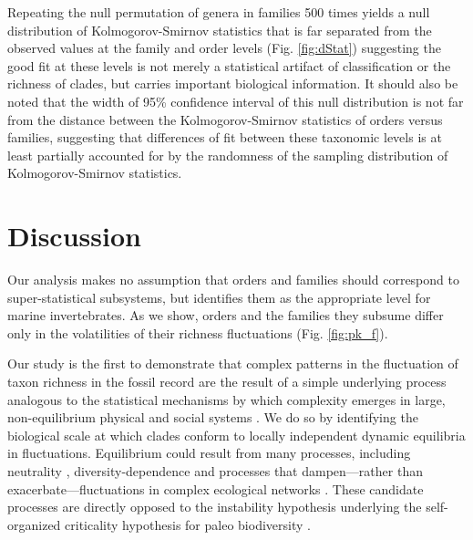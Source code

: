 \documentclass[12pt]{article}
\let\citep=\cite
\begin{document}
Repeating the null permutation of genera in families 500 times yields
a null distribution of Kolmogorov-Smirnov statistics that is far
separated from the observed values at the family and order levels
(Fig. \ref{fig:dStat}) suggesting the good fit at these levels is not
merely a statistical artifact of classification or the richness of
clades, but carries important biological information. It should also
be noted that the width of 95\% confidence interval of this null
distribution is not far from the distance between the
Kolmogorov-Smirnov statistics of orders versus families, suggesting
that differences of fit between these taxonomic levels is at least
partially accounted for by the randomness of the sampling distribution
of Kolmogorov-Smirnov statistics.

\section{Discussion}

Our analysis makes no assumption that orders and families should
correspond to super-statistical subsystems, but identifies them as the
appropriate level for marine invertebrates. As we show, orders and the
families they subsume differ only in the volatilities of their
richness fluctuations (Fig. \ref{fig:pk_f}).

Our study is the first to demonstrate that complex patterns in the
fluctuation of taxon richness in the fossil record are the result of a
simple underlying process analogous to the statistical mechanisms by
which complexity emerges in large, non-equilibrium physical
\citep{beck2004} and social systems \citep{fuentes2009}.  We do so by
identifying the biological scale at which clades conform to locally
independent dynamic equilibria in fluctuations.  Equilibrium could
result from many processes, including neutrality \citep{macWilson,
  hubbell2001, olszewski2004}, diversity-dependence
\citep{rabosky2009ecolLett, moen2014, foote2018} and processes that
dampen---rather than exacerbate---fluctuations in complex ecological
networks \citep{berlow2009}. These candidate processes are directly
opposed to the instability hypothesis underlying the self-organized
criticality hypothesis for paleo biodiversity \citep{bak1993,
  sole1997}.
\end{document}
